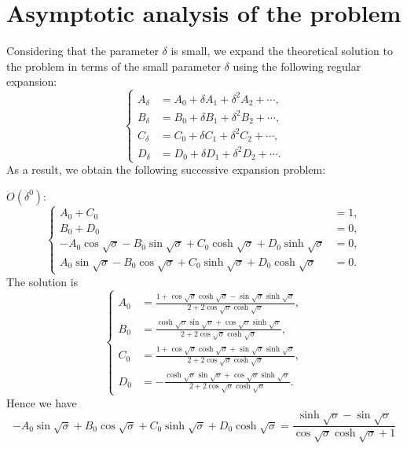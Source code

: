 \documentclass{article}
\begin{document}
\section{Asymptotic analysis of the problem}

Considering that the parameter $\delta$ is small, we expand the theoretical solution to the problem in terms of the small parameter $\delta$ using the following regular expansion:
\begin{equation}
    \left\{\begin{aligned}
        A_\delta &= A_0 + \delta A_1 + \delta^2 A_2 + \cdots, \\
        B_\delta &= B_0 + \delta B_1 + \delta^2 B_2 + \cdots, \\
        C_\delta &= C_0 + \delta C_1 + \delta^2 C_2 + \cdots, \\
        D_\delta &= D_0 + \delta D_1 + \delta^2 D_2 + \cdots. 
    \end{aligned}\right.
\end{equation}
As a result, we obtain the following successive expansion problem:

\noindent
$O(\delta^0)$:
\begin{equation}
    \left\{\begin{aligned}
        A_0 + C_0 &= 1, \\
        B_0 + D_0 &= 0, \\
        - A_0 \cos{\sqrt{\sigma}} - B_0 \sin{\sqrt{\sigma}} + C_0 \cosh{\sqrt{\sigma}} + D_0 \sinh{\sqrt{\sigma}} &= 0, \\
        A_0 \sin{\sqrt{\sigma}} - B_0 \cos{\sqrt{\sigma}} + C_0 \sinh{\sqrt{\sigma}} + D_0 \cosh{\sqrt{\sigma}} &= 0.
    \end{aligned}\right.
\end{equation}
The solution is
\begin{equation}
    \left\{\begin{aligned}
        A_0 &= \frac{1 + \cos\sqrt{\sigma} \cosh\sqrt{\sigma} - \sin\sqrt{\sigma} \sinh\sqrt{\sigma} }{2 + 2 \cos\sqrt{\sigma} \cosh\sqrt{\sigma} }, \\
        B_0 &= \frac{\cosh\sqrt{\sigma} \sin\sqrt{\sigma} + \cos\sqrt{\sigma} \sinh\sqrt{\sigma} }{2 + 2 \cos\sqrt{\sigma} \cosh\sqrt{\sigma} }, \\
        C_0 &= \frac{1 + \cos\sqrt{\sigma} \cosh\sqrt{\sigma} + \sin\sqrt{\sigma} \sinh\sqrt{\sigma} }{2 + 2 \cos\sqrt{\sigma} \cosh\sqrt{\sigma} }, \\
        D_0 &= -\frac{\cosh\sqrt{\sigma} \sin\sqrt{\sigma} + \cos\sqrt{\sigma} \sinh\sqrt{\sigma} }{2 + 2 \cos\sqrt{\sigma} \cosh\sqrt{\sigma} }.
    \end{aligned}\right.
\end{equation}
Hence we have
\begin{equation}
    - A_0 \sin{\sqrt{\sigma}} + B_0 \cos{\sqrt{\sigma}} + C_0 \sinh{\sqrt{\sigma}} + D_0 \cosh{\sqrt{\sigma}} = \frac{\sinh\sqrt{\sigma }-\sin\sqrt{\sigma }}{\cos\sqrt{\sigma } \cosh\sqrt{\sigma }+1}
\end{equation}
\end{document}
